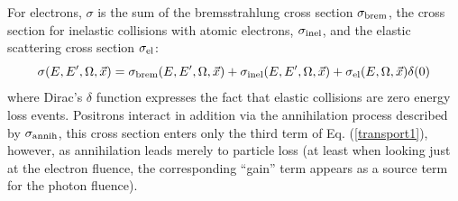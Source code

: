 For electrons, $\sigma$ is the sum of the
bremsstrahlung cross section $\sigma_{\rm brem}$, the cross section
for inelastic collisions with atomic electrons, $\sigma_{\rm inel}$,
and the elastic scattering cross section $\sigma_{\rm el}$:
\begin{equation}
\sigma(E,E',\Omega,\vec{x}) = \sigma_{\rm brem}(E,E',\Omega,\vec{x})
+ \sigma_{\rm inel}(E,E',\Omega,\vec{x}) +
\sigma_{\rm el}(E,\Omega,\vec{x}) \delta(0)
\end{equation}
where Dirac's $\delta$ function expresses the fact that
elastic collisions are zero energy loss events. Positrons
interact in addition via the annihilation process described
by $\sigma_{\rm annih}$, this cross section enters
only the third term of Eq. (\ref{transport1}), however, as annihilation
leads merely to particle loss  (at least when looking just at
the electron fluence, the corresponding ``gain'' term appears
as a source term for the photon fluence).

